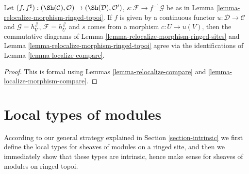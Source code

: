 \begin{lemma}
\label{lemma-relocalize-morphism-compare}
Let
$(f, f^\sharp) :
(\Sh(\mathcal{C}), \mathcal{O})
\to
(\Sh(\mathcal{D}), \mathcal{O}')$,
$s : \mathcal{F} \to f^{-1}\mathcal{G}$ be as in
Lemma \ref{lemma-relocalize-morphism-ringed-topoi}.
If $f$ is given by a continuous functor
$u : \mathcal{D} \to \mathcal{C}$
and $\mathcal{G} = h_V^\#$,
$\mathcal{F} = h_U^\#$ and $s$ comes from a morphism
$c : U \to u(V)$, then
the commutative diagrams of
Lemma \ref{lemma-relocalize-morphism-ringed-sites}
and
Lemma \ref{lemma-relocalize-morphism-ringed-topoi}
agree via the identifications of
Lemma \ref{lemma-localize-compare}.
\end{lemma}

\begin{proof}
This is formal using
Lemmas \ref{lemma-relocalize-compare} and
\ref{lemma-localize-morphism-compare}.
\end{proof}

















\section{Local types of modules}
\label{section-local}

\noindent
According to our general strategy explained in Section \ref{section-intrinsic}
we first define the local types for sheaves of modules on a ringed site, and
then we immediately show that these types are intrinsic, hence make sense
for sheaves of modules on ringed topoi.

